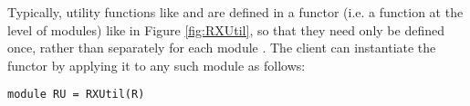Typically, utility functions like  and  are defined in a functor (i.e. a function at the level of modules) like  in Figure \ref{fig:RXUtil}, so that they need only be defined once, rather than separately for each module . The client can instantiate the functor by applying it to any such module as follows:
\begin{lstlisting}[numbers=none]
module RU = RXUtil(R)
\end{lstlisting}


